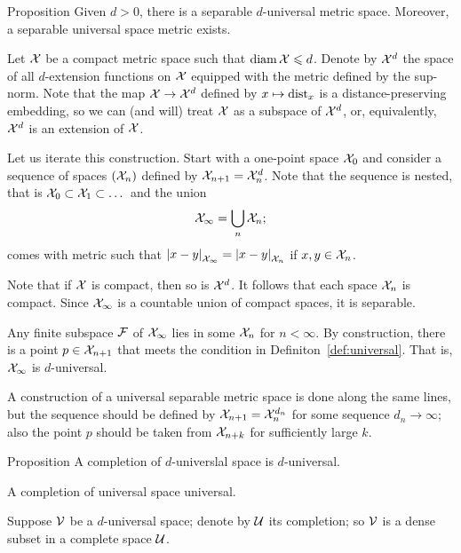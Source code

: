 \begin{thm}{Proposition}\label{prop:univeral-separable}
Given $d>0$, there is a separable $d$-universal metric space.
Moreover, a separable universal space metric exists.
\end{thm}

Let $\mathcal{X}$ be a compact metric space such that $\operatorname{\rm diam}\nolimits\mathcal{X}\leqslant d$.
Denote by $\mathcal{X}^d$ the space of all $d$-extension functions on $\mathcal{X}$ equipped with the metric defined by the sup-norm.
Note that the map $\mathcal{X} \to \mathcal{X}^d$ defined by $x\mapsto\mathrm{dist}_x$ is a distance-preserving embedding,
so we can (and will) treat $\mathcal{X}$ as a subspace of $\mathcal{X}^d$, or, equivalently, $\mathcal{X}^d$ is an extension of $\mathcal{X}$.

Let us iterate this construction.
Start with a one-point space $\mathcal{X}_0$ and consider a sequence of spaces $(\mathcal{X}_n)$ defined by $\spc{X}_{n+1}\z=\spc{X}_n^d$.
Note that the sequence is nested, that is $\mathcal{X}_0\subset \mathcal{X}_1\subset\dots$
and the union
\[\mathcal{X}_\infty=\bigcup_n\mathcal{X}_n;\]
comes with metric such that
$\dist{x}{y}{\spc{X}_\infty} = \dist{x}{y}{\spc{X}_n}$
if $x,y\in\mathcal{X}_n$.

Note that if $\mathcal{X}$ is compact, then so is $\mathcal{X}^d$.
It follows that each space $\mathcal{X}_n$ is compact.
Since $\mathcal{X}_\infty$ is a countable union of compact spaces, it is separable.

Any finite subspace $\mathcal{F}$ of $\mathcal{X}_\infty$ lies in some $\mathcal{X}_n$ for $n<\infty$.
By construction, there is a point $p\in \mathcal{X}_{n+1}$ that meets the condition in Definiton~\ref{def:universal}.
That is, $\mathcal{X}_\infty$ is $d$-universal.

A construction of a universal separable metric space is done along the same lines, but the sequence should be defined by $\spc{X}_{n+1}\z=\spc{X}_n^{d_n}$ for some sequence $d_n\to\infty$;
also the point $p$ should be taken from $\mathcal{X}_{n+k}$ for sufficiently large $k$.
\qeds

\begin{thm}{Proposition}\label{prop:completion-univeral}
A completion of $d$-universlal space is $d$-universal.

A completion of universal space universal.
\end{thm}

 Suppose $\mathcal{V}$ be a $d$-universal space;
denote by $\mathcal{U}$ its completion; so $\mathcal{V}$ is a dense subset in a complete space $\mathcal{U}$.

